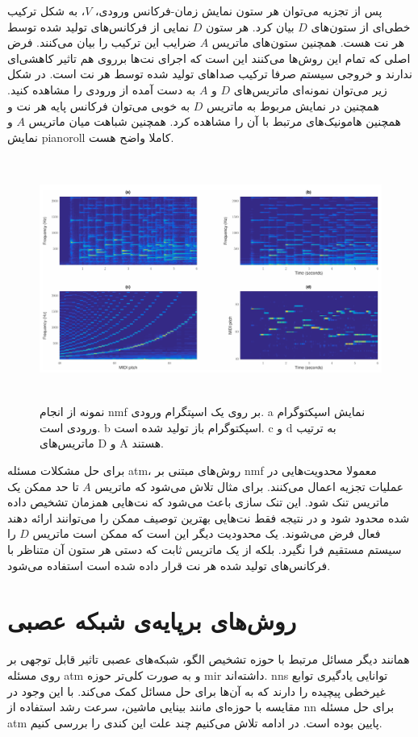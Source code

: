 پس از تجزیه می‌توان هر ستون نمایش زمان-فرکانس ورودی، $V$، به شکل ترکیب خطی‌ای از
ستون‌های $D$ بیان کرد. هر ستون $D$ نمایی از فرکانس‌های تولید شده توسط هر نت هست.
همچنین ستون‌های ماتریس $A$ ضرایب این ترکیب را بیان می‌کنند. فرض اصلی که تمام این
روش‌ها می‌کنند این است که اجرای نت‌ها برروی هم تاثیر کاهشی‌ای ندارند و خروجی
سیستم صرفا ترکیب صداهای تولید شده توسط هر نت است. در شکل زیر می‌توان نمونه‌ای
ماتریس‌های $D$ و $A$ به دست آمده از ورودی را مشاهده کنید. همچنین در نمایش مربوط
به ماتریس $D$ به خوبی می‌توان فرکانس پایه هر نت و همچنین هامونیک‌های مرتبط با آن
را مشاهده کرد. همچنین شباهت میان ماتریس $A$ و نمایش \gls{pianoroll} کاملا واضح
هست.
\begin{figure}
    \centering
    \includegraphics[height=8cm]{./statics/nmf_visualized.png}
    \caption{نمونه از انجام \gls{nmf} بر روی یک اسپتگرام ورودی.
a نمایش اسپکتوگرام ورودی است.
b اسپکتوگرام باز تولید شده است.
c و d به ترتیب ماتریس‌های D و A هستند.}
\end{figure}

برای حل مشکلات مسئله \gls{atm}، روش‌های مبتنی بر \gls{nmf} معمولا محدویت‌هایی در
عملیات تجزیه اعمال می‌کنند. برای مثال تلاش می‌شود که ماتریس $A$ تا حد ممکن یک
ماتریس تنک شود. این تنک سازی باعث می‌شود که نت‌هایی همزمان تشخیص داده شده محدود
شود و در نتیجه فقط نت‌هایی بهترین توصیف ممکن را می‌توانند ارائه دهند فعال فرض
می‌شوند. یک محدودیت دیگر این است که ممکن است ماتریس $D$ را سیستم مستقیم فرا
نگیرد. بلکه از یک ماتریس ثابت که دستی هر ستون آن متناظر با فرکانس‌های تولید شده
هر نت قرار داده شده است استفاده می‌شود.

\section{روش‌های برپایه‌ی شبکه‌ عصبی}
همانند دیگر مسائل مرتبط با حوزه تشخیص الگو، شبکه‌های عصبی تاثیر قابل توجهی بر
روی مسئله \gls{atm} و به صورت کلی‌تر حوزه \gls{mir} داشته‌اند. \glspl{nn}
توانایی یادگیری توابع غیرخطی پیچیده‌ را دارند که به آن‌ها برای حل مسائل کمک
می‌کند. با این وجود در مقایسه با حوزه‌ای مانند بینایی ماشین، سرعت رشد استفاده از
\gls{nn} برای حل مسئله \gls{atm} پایین بوده است. در ادامه تلاش می‌کنیم چند علت
این کندی را بررسی کنیم.

